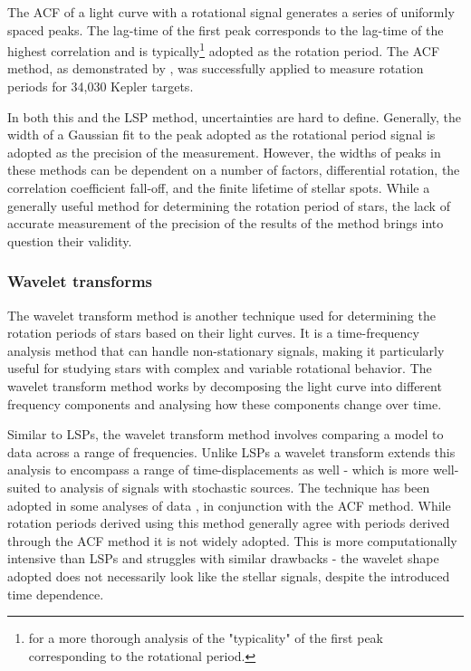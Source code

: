 The ACF of a light curve with a rotational signal generates a series of uniformly spaced peaks. 
The lag-time of the first peak corresponds to the lag-time of the highest correlation and is typically\footnote{\citep[see, e.g.,][]{mcquillan_rotation_2014} for a more thorough analysis of the "typicality" of the first peak corresponding to the rotational period.} adopted as the rotation period.
The ACF method, as demonstrated by \citet{mcquillan_rotation_2014}, was successfully applied to measure rotation periods for 34,030 Kepler targets.

In both this and the LSP method, uncertainties are hard to define.
Generally, the width of a Gaussian fit to the peak adopted as the rotational period signal is adopted as the precision of the measurement.
However, the widths of peaks in these methods can be dependent on a number of factors, differential rotation, the correlation coefficient fall-off, and the finite lifetime of stellar spots.
While a generally useful method for determining the rotation period of stars, the lack of accurate measurement of the precision of the results of the method brings into question their validity.

\subsubsection*{Wavelet transforms}

The wavelet transform method is another technique used for determining the rotation periods of stars based on their light curves. 
It is a time-frequency analysis method that can handle non-stationary signals, making it particularly useful for studying stars with complex and variable rotational behavior.
The wavelet transform method works by decomposing the light curve into different frequency components and analysing how these components change over time. 

Similar to LSPs, the wavelet transform method involves comparing a model to data across a range of frequencies.
Unlike LSPs a wavelet transform extends this analysis to encompass a range of time-displacements as well - which is more well-suited to analysis of signals with stochastic sources.
The technique has been adopted in some analyses of \kepler{} data \citep{garcia_rotation_2014}, in conjunction with the ACF method.
While rotation periods derived using this method generally agree with periods derived through the ACF method it is not widely adopted.
This is more computationally intensive than LSPs and struggles with similar drawbacks - the wavelet shape adopted does not necessarily look like the stellar signals, despite the introduced time dependence.

